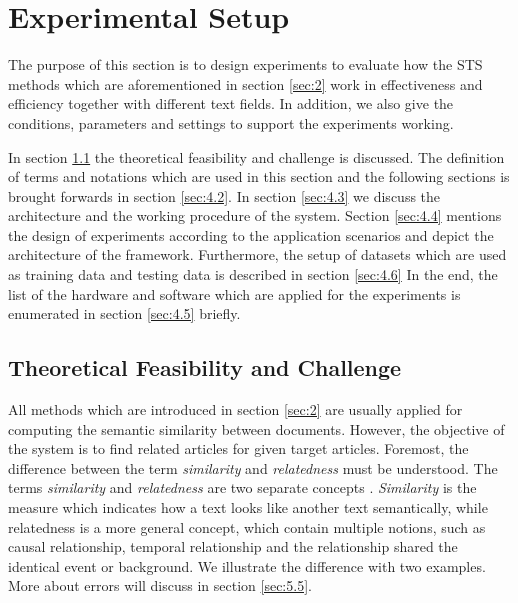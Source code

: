 \section{Experimental Setup}
\label{sec:4}

The purpose of this section is to design experiments to evaluate how the STS methods which are aforementioned in section \ref{sec:2} work in effectiveness and efficiency together with different text fields. In addition, we also give the conditions, parameters and settings to support the experiments working. 

In section \ref{sec:4.1} the theoretical feasibility and challenge is discussed. The definition of terms and notations which are used in this section and the following sections is brought forwards in section \ref{sec:4.2}. In section \ref{sec:4.3} we discuss the architecture and the working procedure of the system. Section \ref{sec:4.4} mentions the design of experiments according to the application scenarios and depict the architecture of the framework. Furthermore, the setup of datasets which are used as training data and testing data is described in section \ref{sec:4.6} In the end, the list of the hardware and software which are applied for the experiments is enumerated in section \ref{sec:4.5} briefly.

\bigbreak

\subsection{Theoretical Feasibility and Challenge}
\label{sec:4.1}

All methods which are introduced in section \ref{sec:2} are usually applied for computing the semantic similarity between documents. However, the objective of the system is to find related articles for given target articles. Foremost, the difference between the term \textit{similarity} and \textit{relatedness} must be understood. The terms \textit{similarity} and \textit{relatedness} are two separate concepts \cite{pedersen2007measures}. \textit{Similarity} is the measure which indicates how a text looks like another text semantically, while relatedness is a more general concept, which contain multiple notions, such as causal relationship, temporal relationship and the relationship shared the identical event or background. We illustrate the difference with two examples. More about errors will discuss in section \ref{sec:5.5}. 

